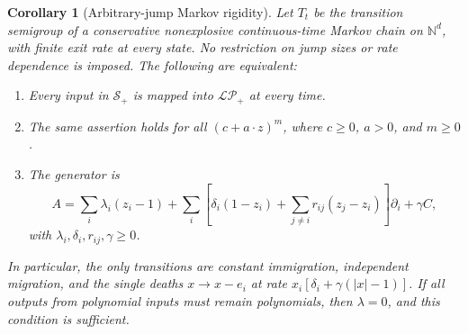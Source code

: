 \documentclass[reqno]{amsart}
\newtheorem{corollary}[theorem]{Corollary}
\theoremstyle{definition}
\theoremstyle{remark}
\newcommand{\N}{\mathbb N}
\begin{document}
\begin{corollary}[Arbitrary-jump Markov rigidity]\label{pos:markov}
Let \(T_t\) be the transition semigroup of a conservative nonexplosive continuous-time
Markov chain on \(\N^d\), with finite exit rate at every state.  No restriction on
jump sizes or rate dependence is imposed.  The following are equivalent:
\begin{enumerate}
\item Every input in \(\mathcal S_+\) is mapped into \(\mathcal{LP}_+\) at every time.
\item The same assertion holds for all \((c+a\cdot z)^m\), where
\(c\ge0\), \(a>0\), and \(m\ge0\).
\item The generator is
\begin{equation}\label{pos:markov-generator}
 A=\sum_i\lambda_i(z_i-1)+
 \sum_i\left[\delta_i(1-z_i)+\sum_{j\ne i}r_{ij}(z_j-z_i)\right]\partial_i
 +\gamma C,
\end{equation}
with \(\lambda_i,\delta_i,r_{ij},\gamma\ge0\).
\end{enumerate}
In particular, the only transitions are constant immigration, independent
migration, and the single deaths
\(x\to x-e_i\) at rate \(x_i[\delta_i+\gamma(|x|-1)]\).
If all outputs from polynomial inputs must remain polynomials, then
\(\lambda=0\), and this condition is sufficient.
\end{corollary}
\end{document}
